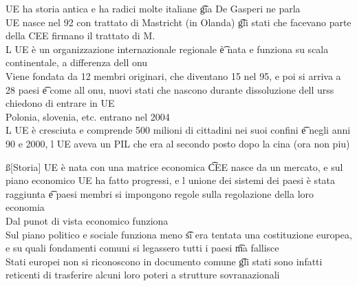 \documentclass[12pt]{article}
\begin{document}
UE ha storia antica e ha radici molte italiane \t gia De Gasperi ne parla \\
UE nasce nel 92 con trattato di Mastricht (in Olanda) \t gli stati che facevano parte della CEE firmano il trattato di M. \\
L UE è un organizzazione internazionale regionale \t è nata e funziona su scala continentale, a differenza dell onu \\
Viene fondata da 12 membri originari, che diventano 15 nel 95, e poi si arriva a 28 paesi \t e come all onu, nuovi stati che nascono durante dissoluzione dell urss chiedono di entrare in UE \\
Polonia, slovenia, etc. entrano nel 2004 \\
L UE è cresciuta e comprende 500 milioni di cittadini nei suoi confini \t e negli anni 90 e 2000, l UE aveva un PIL che era al secondo posto dopo la cina (ora non piu)

\ss[Storia]
UE è nata con una matrice economica \t CEE nasce da un mercato, e sul piano economico UE ha fatto progressi, e l unione dei sistemi dei paesi è stata raggiunta \t e paesi membri si impongono regole sulla regolazione della loro economia \\
Dal punot di vista economico funziona \\
Sul piano politico e sociale funziona meno \t si era tentata una costituzione europea, e su quali fondamenti comuni si legassero tutti i paesi \t ma fallisce \\
Stati europei non si riconoscono in documento comune \t gli stati sono infatti reticenti di trasferire alcuni loro poteri a strutture sovranazionali
\end{document}
